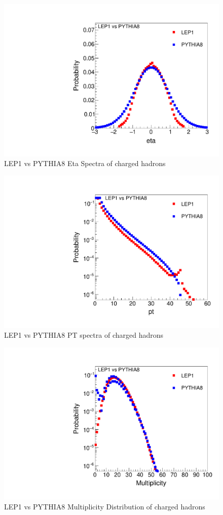 \begin{figure}[!htb]
\begin{center}
\includegraphics[width=.45\textwidth]{images/DataQualityCheck/eta_LEP1_PYTHIA8.pdf}
\caption{LEP1 vs PYTHIA8 Eta Spectra of charged hadrons}
\label{fig:figure10} 
\end{center}
\end{figure}

\begin{figure}[!htb]
\begin{center}
\includegraphics[width=.45\textwidth]{images/DataQualityCheck/pt_LEP1_PYTHIA8.pdf}
\caption{LEP1 vs PYTHIA8 PT spectra of charged hadrons}
\label{fig:figure11} 
\end{center}
\end{figure}

\begin{figure}[!htb]
\begin{center}
\includegraphics[width=.45\textwidth]{images/DataQualityCheck/mult_LEP1_PYTHIA8.pdf}
\caption{LEP1 vs PYTHIA8 Multiplicity Distribution of charged hadrons}
\label{fig:figure12} 
\end{center}
\end{figure}